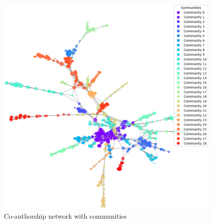 \documentclass[a4paper, review, endfloat, authoryear]{elsarticle}
\begin{document}
	\begin{figure}[htbp]
		\centering
		\includegraphics[scale=0.8]{pics/co-authorship_communities.eps}
		\caption{Co-authorship network with communities}\label{fig:fig4}
	\end{figure}
	
\end{document}
